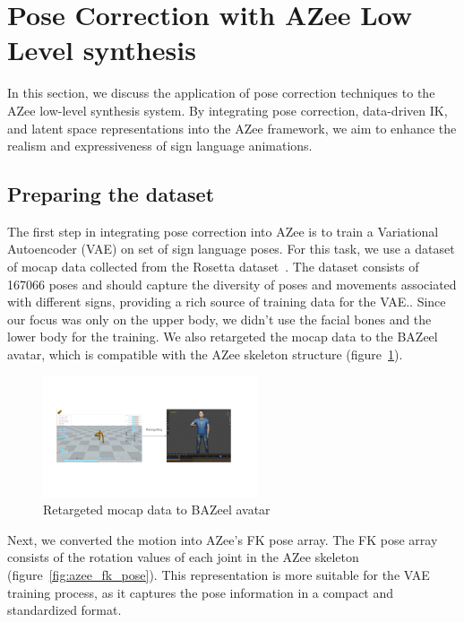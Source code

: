 \documentclass[../../main.tex]{subfiles}
\begin{document}
\section{Pose Correction with AZee Low Level synthesis}
\label{ch:pose_correction:pose_correction_with_azee}

In this section, we discuss the application of pose correction techniques to the AZee low-level synthesis system. By integrating pose correction, data-driven IK, and latent space representations into the AZee framework, we aim to enhance the realism and expressiveness of sign language animations.

\subsection{Preparing the dataset}
\label{ch:pose_correction:pose_correction_with_azee:dataset}

The first step in integrating pose correction into AZee is to train a Variational Autoencoder (VAE) on set of sign language poses. For this task, we use a dataset of mocap data collected from the Rosetta dataset~\cite{bertin2022rosetta}. The dataset consists of 167066 poses and should capture the diversity of poses and movements associated with different signs, providing a rich source of training data for the VAE.. Since our focus was only on the upper body, we didn't use the facial bones and the lower body for the training. We also retargeted the mocap data to the BAZeel avatar, which is compatible with the AZee skeleton structure (figure~\ref{fig:retargeted}).

\begin{figure}
  \centering \includegraphics[width = 2.5in]{chapters/pose_correction/images/retargeted.png}
  \caption{Retargeted mocap data to BAZeel avatar}
  \label{fig:retargeted}
\end{figure}

Next, we converted the motion into AZee's FK pose array. The FK pose array consists of the rotation values of each joint in the AZee skeleton (figure~\ref{fig:azee_fk_pose}). This representation is more suitable for the VAE training process, as it captures the pose information in a compact and standardized format.
\end{document}

